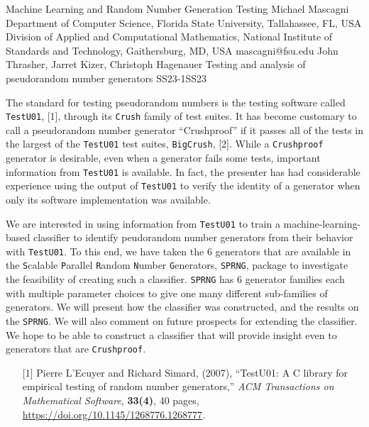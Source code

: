 \begin{talk}
  {Machine Learning and Random Number Generation Testing}%
  {Michael Mascagni}%
  {Department of Computer Science, Florida State University, Tallahassee, FL, USA\\Division of Applied and Computational Mathematics, National Institute of Standards and Technology, Gaithersburg, MD, USA}%
  {mascagni@fsu.edu}%
  {John Thrasher, Jarret Kizer, Christoph Hagenauer}%
{Testing and analysis of pseudorandom number generators}
{}{SS23-1}{SS23}

			
The standard for testing pseudorandom numbers is the testing software called {\tt TestU01}, [1], through its {\tt Crush} family of test suites.  It has become customary to call a pseudorandom number generator ``Crushproof'' if it passes all of the tests in the largest of the {\tt TestU01} test suites, {\tt BigCrush}, [2].  While a {\tt Crushproof}  generator is desirable, even when a generator fails some tests, important information from {\tt TestU01} is available.  In fact, the presenter has had considerable experience using the output of {\tt TestU01} to verify the identity of a generator when only its software implementation was available.

We are interested in using information from {\tt TestU01} to train a machine-learning-based classifier to identify peudorandom number generators from their behavior with {\tt TestU01}.  To this end, we have taken the 6 generators that are available in the {\tt S}calable {\tt P}arallel {\tt R}andom {\tt N}umber {\tt G}enerators, {\tt SPRNG}, package to investigate the feasibility of creating such a classifier.  {\tt SPRNG} has 6 generator families each with multiple parameter choices to give one many different sub-families of generators.  We will present how the classifier was constructed, and the results on the {\tt SPRNG}.  We will also comment on future prospects for extending the classifier.  We hope to be able to construct a classifier that will provide insight even to generators that are {\tt Crushproof}.

\medskip

\begin{enumerate}
\item[{[1]}] Pierre L'Ecuyer and Richard Simard, (2007),
``TestU01: A C library for empirical testing of random number generators,''
{\it ACM Transactions on Mathematical Software}, {\bf 33(4)}, 40 pages, 
\url{https://doi.org/10.1145/1268776.1268777}.


\end{enumerate}
\end{talk}
